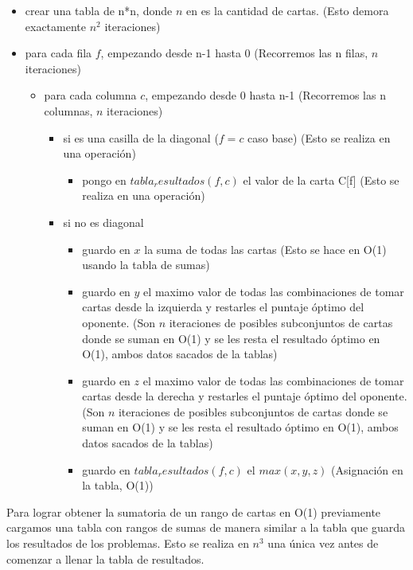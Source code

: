 \begin{itemize}
\item crear una tabla de n*n, donde $n$ en es la cantidad de cartas. (Esto demora exactamente $n^2$ iteraciones)
\item para cada fila $f$, empezando desde n-1 hasta 0 (Recorremos las n filas, $n$ iteraciones)
	\begin{itemize}
	\item para cada columna $c$, empezando desde 0 hasta n-1 (Recorremos las n columnas, $n$ iteraciones)
		\begin{itemize}
			\item si es una casilla de la diagonal ($f = c$ caso base) (Esto se realiza en una operaci\'on)
				\begin{itemize}
				\item pongo en $tabla_resultados(f,c)$ el valor de la carta C[f] (Esto se realiza en una operaci\'on)
				\end{itemize}
			\item si no es diagonal
				\begin{itemize}
				\item guardo en $x$ la suma de todas las cartas (Esto se hace en O(1) usando la tabla de sumas)
				\item guardo en $y$ el maximo valor de todas las combinaciones de tomar cartas desde la izquierda y restarles el puntaje \'optimo del oponente. (Son $n$ iteraciones de posibles subconjuntos de cartas donde se suman en O(1) y se les resta el resultado \'optimo en O(1), ambos datos sacados de la tablas)
				\item guardo en $z$ el maximo valor de todas las combinaciones de tomar cartas desde la derecha y restarles el puntaje \'optimo del oponente. (Son $n$ iteraciones de posibles subconjuntos de cartas donde se suman en O(1) y se les resta el resultado \'optimo en O(1), ambos datos sacados de la tablas)
				\item guardo en $tabla_resultados(f,c)$ el $max(x,y,z)$ (Asignaci\'on en la tabla, O(1))
				\end{itemize}
		\end{itemize}
	\end{itemize}
\end{itemize}

Para lograr obtener la sumatoria de un rango de cartas en O(1) previamente cargamos una tabla con rangos de sumas de manera similar a la tabla que guarda los resultados de los problemas. Esto se realiza en $n^3$ una \'unica vez antes de comenzar a llenar la tabla de resultados. \\

